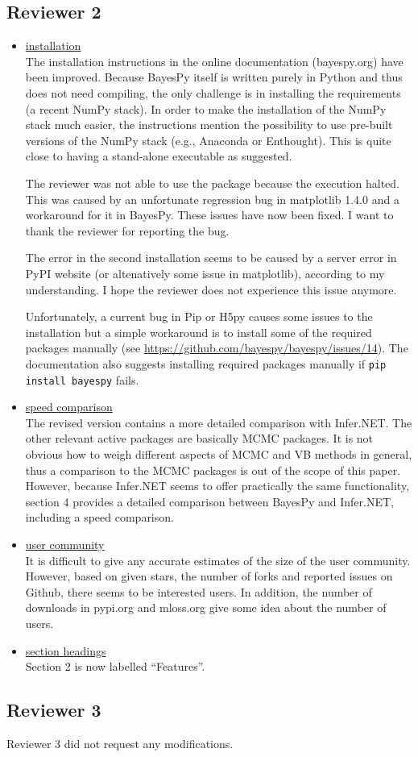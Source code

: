 \documentclass{article}
\begin{document}
\subsection{Reviewer 2}

\begin{itemize}

\item \underline{installation}
  \\
  The installation instructions in the online documentation (bayespy.org) have
  been improved.  Because BayesPy itself is written purely in Python and thus
  does not need compiling, the only challenge is in installing the requirements
  (a recent NumPy stack).  In order to make the installation of the NumPy stack
  much easier, the instructions mention the possibility to use pre-built
  versions of the NumPy stack (e.g., Anaconda or Enthought).  This is quite
  close to having a stand-alone executable as suggested.

  The reviewer was not able to use the package because the execution halted.
  This was caused by an unfortunate regression bug in matplotlib 1.4.0 and a
  workaround for it in BayesPy.  These issues have now been fixed.  I want to
  thank the reviewer for reporting the bug.

  The error in the second installation seems to be caused by a server error in
  PyPI website (or altenatively some issue in matplotlib), according to my
  understanding.  I hope the reviewer does not experience this issue anymore.

  Unfortunately, a current bug in Pip or H5py causes some issues to the
  installation but a simple workaround is to install some of the required
  packages manually (see \url{https://github.com/bayespy/bayespy/issues/14}).
  The documentation also suggests installing required packages manually if
  \texttt{pip install bayespy} fails.

\item \underline{speed comparison}
  \\
  The revised version contains a more detailed comparison with Infer.NET.  The
  other relevant active packages are basically MCMC packages.  It is not obvious
  how to weigh different aspects of MCMC and VB methods in general, thus a
  comparison to the MCMC packages is out of the scope of this paper.  However,
  because Infer.NET seems to offer practically the same functionality, section 4
  provides a detailed comparison between BayesPy and Infer.NET, including a
  speed comparison.

\item \underline{user community}
  \\
  It is difficult to give any accurate estimates of the size of the user
  community.  However, based on given stars, the number of forks and reported
  issues on Github, there seems to be interested users.  In addition, the number
  of downloads in pypi.org and mloss.org give some idea about the number of
  users.

\item \underline{section headings}
  \\
  Section 2 is now labelled ``Features''.

\end{itemize}

\subsection{Reviewer 3}

Reviewer 3 did not request any modifications.
\end{document}
